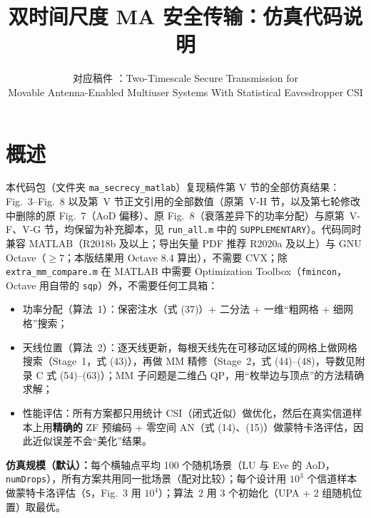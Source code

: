\documentclass[11pt,a4paper]{ctexart}
\title{双时间尺度 MA 安全传输：仿真代码说明}
\author{对应稿件 \code{main.tex}：Two-Timescale Secure Transmission for\\ Movable Antenna-Enabled Multiuser Systems With Statistical Eavesdropper CSI}
\date{}
\newcommand{\code}[1]{\texttt{#1}}
\begin{document}
\sloppy
\maketitle
\tableofcontents

\section{概述}
本代码包（文件夹 \code{ma\_secrecy\_matlab}）复现稿件第 V 节的全部仿真结果：Fig.~3--Fig.~8 以及第~V 节正文引用的全部数值（原第~V-H 节，以及第七轮修改中删除的原 Fig.~7（AoD 偏移）、原 Fig.~8（衰落差异下的功率分配）与原第~V-F、V-G 节，均保留为补充脚本，见 \code{run\_all.m} 中的 \code{SUPPLEMENTARY}）。代码同时兼容 MATLAB（R2018b 及以上；导出矢量 PDF 推荐 R2020a 及以上）与 GNU Octave（$\ge 7$；本版结果用 Octave 8.4 算出），不需要 CVX；除 \code{extra\_mm\_compare.m} 在 MATLAB 中需要 Optimization Toolbox（\code{fmincon}，Octave 用自带的 \code{sqp}）外，不需要任何工具箱：
\begin{itemize}
\item 功率分配（算法~1）：保密注水（式 (37)）+ 二分法 + 一维“粗网格 + 细网格”搜索；
\item 天线位置（算法~2）：逐天线更新，每根天线先在可移动区域的网格上做网格搜索（Stage~1，式 (43)），再做 MM 精修（Stage~2，式 (44)--(48)，导数见附录 C 式 (54)--(63)）；MM 子问题是二维凸 QP，用“枚举边与顶点”的方法精确求解；
\item 性能评估：所有方案都只用统计 CSI（闭式近似）做优化，然后在真实信道样本上用\textbf{精确的} ZF 预编码 + 零空间 AN（式 (14)、(15)）做蒙特卡洛评估，因此近似误差不会“美化”结果。
\end{itemize}

\textbf{仿真规模（默认）：}每个横轴点平均 100 个随机场景（LU 与 Eve 的 AoD，\code{numDrops}），所有方案共用同一批场景（配对比较）；每个设计用 $10^3$ 个信道样本做蒙特卡洛评估（\code{S}，Fig.~3 用 $10^4$）；算法~2 用 3 个初始化（UPA + 2 组随机位置）取最优。

\end{document}

